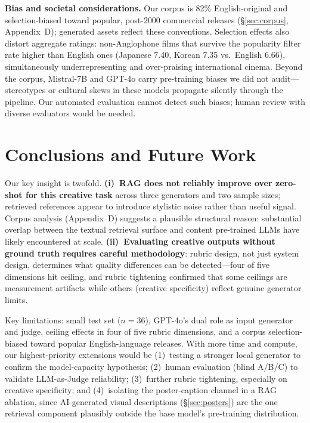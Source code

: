 \documentclass[10pt,twocolumn]{article}
\begin{document}
\textbf{Bias and societal considerations.} Our corpus is 82\% English-original and selection-biased toward popular, post-2000 commercial releases (\S\ref{sec:corpus}, Appendix~D); generated assets reflect these conventions. Selection effects also distort aggregate ratings: non-Anglophone films that survive the popularity filter rate higher than English ones (Japanese 7.40, Korean 7.35 vs.\ English 6.66), simultaneously underrepresenting and over-praising international cinema. Beyond the corpus, Mistral-7B and GPT-4o carry pre-training biases we did not audit---stereotypes or cultural skews in these models propagate silently through the pipeline. Our automated evaluation cannot detect such biases; human review with diverse evaluators would be needed.

\section{Conclusions and Future Work}
\label{sec:conclusion}

Our key insight is twofold. \textbf{(i)~RAG does not reliably improve over zero-shot for this creative task} across three generators and two sample sizes; retrieved references appear to introduce stylistic noise rather than useful signal. Corpus analysis (Appendix~D) suggests a plausible structural reason: substantial overlap between the textual retrieval surface and content pre-trained LLMs have likely encountered at scale. \textbf{(ii)~Evaluating creative outputs without ground truth requires careful methodology}: rubric design, not just system design, determines what quality differences can be detected---four of five dimensions hit ceiling, and rubric tightening confirmed that some ceilings are measurement artifacts while others (creative specificity) reflect genuine generator limits.

Key limitations: small test set ($n{=}36$), GPT-4o's dual role as input generator and judge, ceiling effects in four of five rubric dimensions, and a corpus selection-biased toward popular English-language releases. With more time and compute, our highest-priority extensions would be (1)~testing a stronger local generator to confirm the model-capacity hypothesis; (2)~human evaluation (blind A/B/C) to validate LLM-as-Judge reliability; (3)~further rubric tightening, especially on creative specificity; and (4)~isolating the poster-caption channel in a RAG ablation, since AI-generated visual descriptions (\S\ref{sec:posters}) are the one retrieval component plausibly outside the base model's pre-training distribution.
\end{document}
